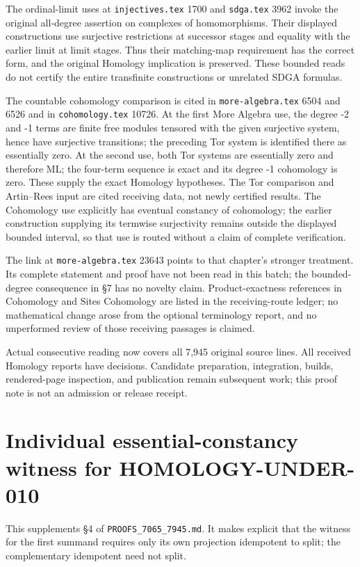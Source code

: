\documentclass[11pt]{article}
\begin{document}
The ordinal-limit uses at \texttt{injectives.tex} 1700 and \texttt{sdga.tex} 3962 invoke the original all-degree assertion on complexes of homomorphisms. Their displayed constructions use surjective restrictions at successor stages and equality with the earlier limit at limit stages. Thus their matching-map requirement has the correct form, and the original Homology implication is preserved. These bounded reads do not certify the entire transfinite constructions or unrelated SDGA formulas.

The countable cohomology comparison is cited in \texttt{more-algebra.tex} 6504 and 6526 and in \texttt{cohomology.tex} 10726. At the first More Algebra use, the degree -2 and -1 terms are finite free modules tensored with the given surjective system, hence have surjective transitions; the preceding Tor system is identified there as essentially zero. At the second use, both Tor systems are essentially zero and therefore ML; the four-term sequence is exact and its degree -1 cohomology is zero. These supply the exact Homology hypotheses. The Tor comparison and Artin--Rees input are cited receiving data, not newly certified results. The Cohomology use explicitly has eventual constancy of cohomology; the earlier construction supplying its termwise surjectivity remains outside the displayed bounded interval, so that use is routed without a claim of complete verification.

The link at \texttt{more-algebra.tex} 23643 points to that chapter's stronger treatment. Its complete statement and proof have not been read in this batch; the bounded-degree consequence in §7 has no novelty claim. Product-exactness references in Cohomology and Sites Cohomology are listed in the receiving-route ledger; no mathematical change arose from the optional terminology report, and no unperformed review of those receiving passages is claimed.

Actual consecutive reading now covers all 7,945 original source lines. All received Homology reports have decisions. Candidate preparation, integration, builds, rendered-page inspection, and publication remain subsequent work; this proof note is not an admission or release receipt.
\clearpage
\section{Individual essential-constancy witness for HOMOLOGY-UNDER-010}\label{note-10-individual-essential-constancy-witness-for-homology-under-010}

This supplements §4 of \texttt{PROOFS\_7065\_7945.md}. It makes explicit that the witness for the first summand requires only its own projection idempotent to split; the complementary idempotent need not split.
\end{document}
